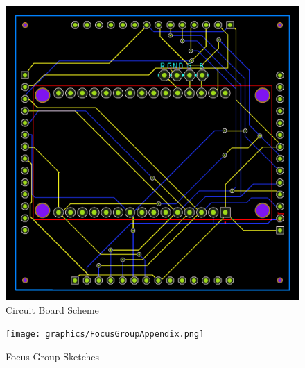 \documentclass[
  a4paper,  %
  twoside,  %
  bibliography=totoc,
  headsepline,
  cleardoublepage=empty,
  parskip=half,
  draft=false
]{scrbook}
\begin{document}
\begin{figure}[H]
    \centering
    \includegraphics[scale=0.3]{graphics/PCB.png}
    \caption{Circuit Board Scheme}
    \label{fig:PCB}
\end{figure}

\begin{figure}
    \centering
    \texttt{[image: graphics/FocusGroupAppendix.png]}
    \caption{Focus Group Sketches}
    \label{fig:Focus_Group_Sketches}
\end{figure}
\end{document}
